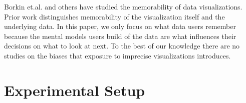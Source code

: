 \documentclass[10pt,journal,compsoc]{IEEEtran}
\begin{document}
Borkin et.al. \cite{borkin2013makes} and others have studied the memorability of data visualizations.
Prior work distinguishes memorability of the visualization itself and the underlying data.
In this paper, we only focus on what data users remember because the mental models users build of the data are what influences their decisions on what to look at next.
To the best of our knowledge there are no studies on the biases that exposure to imprecise visualizations introduces.

\section{Experimental Setup}\label{sec:experimental_setup}

\begin{figure}[!ht]
\centering
{}
\hfil
{}
\hfil
{}
\hfil
{}
\hfil
{}
\end{figure}
\end{document}
